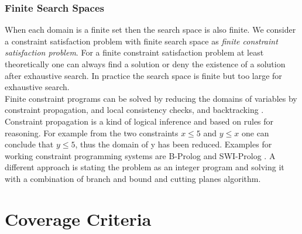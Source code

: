 \subsubsection{Finite Search Spaces}
When each domain is a finite set then the search space is also finite. We consider a constraint satisfaction problem with finite search space as \emph{finite constraint satisfaction problem}. For a finite constraint satisfaction problem at least theoretically one can always find a solution or deny the existence of a solution after exhaustive search. In practice the search space is finite but too large for exhaustive search.\\
Finite constraint programs can be solved by reducing the domains of variables by constraint propagation, and local consistency checks, and backtracking \cite{ConstraintPropagation}. Constraint propagation is a kind of logical inference and based on rules for reasoning. For example from the two constraints $x\leq 5$ and $y \leq x$ one can conclude that $y\leq 5$, thus the domain of y has been reduced. Examples for working constraint programming systems are B-Prolog and SWI-Prolog \cite{citation needed}. %
A different approach is stating the problem as an integer program and solving it with a combination of branch and bound and cutting planes algorithm.

%

\section{Coverage Criteria}
